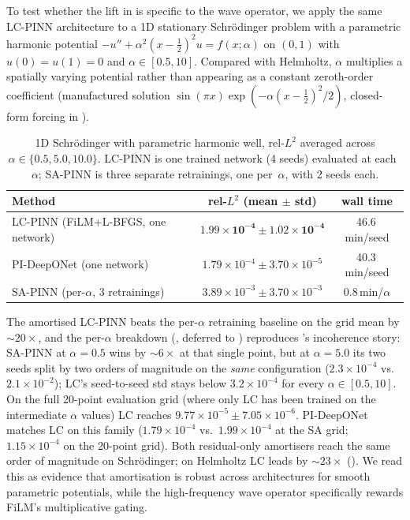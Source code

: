 To test whether the lift in  is specific to
the wave operator, we apply the same LC-PINN architecture to a 1D
stationary Schrödinger problem with a parametric harmonic potential
$-u'' + \alpha^2(x-\tfrac12)^2 u = f(x;\alpha)$ on $(0,1)$ with
$u(0)\!=\!u(1)\!=\!0$ and $\alpha\!\in\![0.5, 10]$. Compared with
Helmholtz, $\alpha$ multiplies a spatially varying potential rather
than appearing as a constant zeroth-order coefficient (manufactured
solution $\sin(\pi x)\exp(-\alpha(x-\tfrac12)^2/2)$, closed-form
forcing in ).

\begin{table}[h]
\centering
\caption{1D Schrödinger with parametric harmonic well, rel-$L^2$
averaged across $\alpha \in \{0.5, 5.0, 10.0\}$. LC-PINN is one
trained network (4 seeds) evaluated at each~$\alpha$; SA-PINN is
three separate retrainings, one per~$\alpha$, with 2 seeds each.}
\label{tab:schrodinger}
\begin{tabular}{lcc}
\toprule
Method & rel-$L^2$ (mean $\pm$ std) & wall time \\
\midrule
LC-PINN (FiLM+L-BFGS, one network)        & $\mathbf{1.99 \times 10^{-4} \pm 1.02 \times 10^{-4}}$ & 46.6\,min/seed \\
PI-DeepONet (one network)                 & $1.79 \times 10^{-4} \pm 3.70 \times 10^{-5}$        & 40.3\,min/seed \\
SA-PINN (per-$\alpha$, 3 retrainings)     & $3.89 \times 10^{-3} \pm 3.70 \times 10^{-3}$ & 0.8\,min/$\alpha$ \\
\bottomrule
\end{tabular}
\end{table}

The amortised LC-PINN beats the per-$\alpha$ retraining baseline on
the grid mean by $\sim\!20\times$, and the per-$\alpha$ breakdown
(, deferred to
) reproduces 's
incoherence story: SA-PINN at $\alpha\!=\!0.5$ wins by $\sim\!6\times$
at that single point, but at $\alpha\!=\!5.0$ its two seeds split by
two orders of magnitude on the \emph{same} configuration
($2.3\!\times\!10^{-4}$ vs.\ $2.1\!\times\!10^{-2}$); LC's seed-to-seed
std stays below $3.2\!\times\!10^{-4}$ for every $\alpha\!\in\![0.5,10]$.
On the full 20-point evaluation grid (where only LC has been trained
on the intermediate $\alpha$ values) LC reaches
$9.77\!\times\!10^{-5} \pm 7.05\!\times\!10^{-6}$.
PI-DeepONet matches LC on this family ($1.79\!\times\!10^{-4}$ vs.\
$1.99\!\times\!10^{-4}$ at the SA grid; $1.15\!\times\!10^{-4}$ on
the 20-point grid). Both residual-only amortisers reach the same
order of magnitude on Schrödinger; on Helmholtz LC leads by
$\sim\!23\times$ (). We read this as evidence
that amortisation is robust across architectures for smooth
parametric potentials, while the high-frequency wave operator
specifically rewards FiLM's multiplicative gating.

